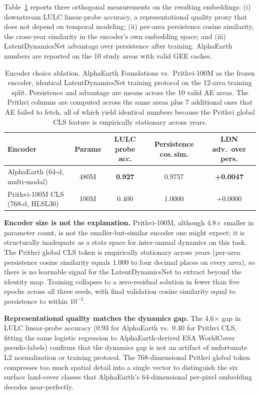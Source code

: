 \documentclass{article}
\begin{document}
Table~\ref{tab:encoder_ablation} reports three orthogonal measurements on the resulting embeddings: (i) downstream LULC linear-probe accuracy, a representational quality proxy that does not depend on temporal modeling; (ii) per-area persistence cosine similarity, the cross-year similarity in the encoder's own embedding space; and (iii) LatentDynamicsNet advantage over persistence after training. AlphaEarth numbers are reported on the 10 study areas with valid GEE caches.

\begin{table}[htbp]
\centering
\caption{Encoder choice ablation. AlphaEarth Foundations vs.\ Prithvi-100M as the frozen encoder, identical LatentDynamicsNet training protocol on the 12-area training split. Persistence and advantage are means across the 10 valid AE areas. The Prithvi columns are computed across the same areas plus 7 additional ones that AE failed to fetch, all of which yield identical numbers because the Prithvi global CLS feature is empirically stationary across years.}
\label{tab:encoder_ablation}
\small
\begin{tabular}{lcccc}
\toprule
Encoder & Params & LULC probe acc. & Persistence cos.\,sim. & LDN adv.\ over pers. \\
\midrule
AlphaEarth (64-d, multi-modal) & 480M & \textbf{0.927} & 0.9757 & \textbf{+0.0047} \\
Prithvi-100M CLS (768-d, HLSL30) & 100M & 0.400 & 1.0000 & $+0.0000$ \\
\bottomrule
\end{tabular}
\end{table}

\textbf{Encoder size is not the explanation.} Prithvi-100M, although 4.8$\times$ smaller in parameter count, is not the smaller-but-similar encoder one might expect; it is structurally inadequate as a state space for inter-annual dynamics on this task. The Prithvi global CLS token is empirically stationary across years (per-area persistence cosine similarity equals 1.000 to four decimal places on every area), so there is no learnable signal for the LatentDynamicsNet to extract beyond the identity map. Training collapses to a zero-residual solution in fewer than five epochs across all three seeds, with final validation cosine similarity equal to persistence to within $10^{-5}$.

\textbf{Representational quality matches the dynamics gap.} The 4.6$\times$ gap in LULC linear-probe accuracy (0.93 for AlphaEarth vs.\ 0.40 for Prithvi CLS, fitting the same logistic regression to AlphaEarth-derived ESA WorldCover pseudo-labels) confirms that the dynamics gap is not an artifact of unfortunate L2 normalization or training protocol. The 768-dimensional Prithvi global token compresses too much spatial detail into a single vector to distinguish the six surface land-cover classes that AlphaEarth's 64-dimensional per-pixel embedding decodes near-perfectly.
\end{document}
